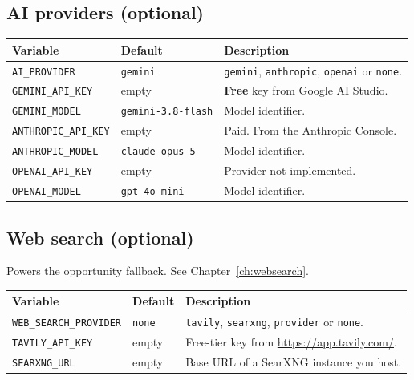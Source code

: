 \documentclass[11pt,a4paper]{report}
\begin{document}
\subsection*{AI providers (optional)}

\begin{center}
\begin{tabularx}{\textwidth}{@{}llX@{}}
\toprule
\textbf{Variable} & \textbf{Default} & \textbf{Description} \\
\midrule
\texttt{AI\_PROVIDER} & \texttt{gemini} & \texttt{gemini}, \texttt{anthropic},
\texttt{openai} or \texttt{none}. \\
\texttt{GEMINI\_API\_KEY} & empty & \textbf{Free} key from Google AI Studio. \\
\texttt{GEMINI\_MODEL} & \texttt{gemini-3.8-flash} & Model identifier. \\
\texttt{ANTHROPIC\_API\_KEY} & empty & Paid. From the Anthropic Console. \\
\texttt{ANTHROPIC\_MODEL} & \texttt{claude-opus-5} & Model identifier. \\
\texttt{OPENAI\_API\_KEY} & empty & Provider not implemented. \\
\texttt{OPENAI\_MODEL} & \texttt{gpt-4o-mini} & Model identifier. \\
\bottomrule
\end{tabularx}
\end{center}

\subsection*{Web search (optional)}

Powers the opportunity fallback. See Chapter~\ref{ch:websearch}.

\begin{center}
\begin{tabularx}{\textwidth}{@{}llX@{}}
\toprule
\textbf{Variable} & \textbf{Default} & \textbf{Description} \\
\midrule
\texttt{WEB\_SEARCH\_PROVIDER} & \texttt{none} & \texttt{tavily},
\texttt{searxng}, \texttt{provider} or \texttt{none}. \\
\texttt{TAVILY\_API\_KEY} & empty & Free-tier key from
\url{https://app.tavily.com/}. \\
\texttt{SEARXNG\_URL} & empty & Base URL of a SearXNG instance you host. \\
\bottomrule
\end{tabularx}
\end{center}
\end{document}
